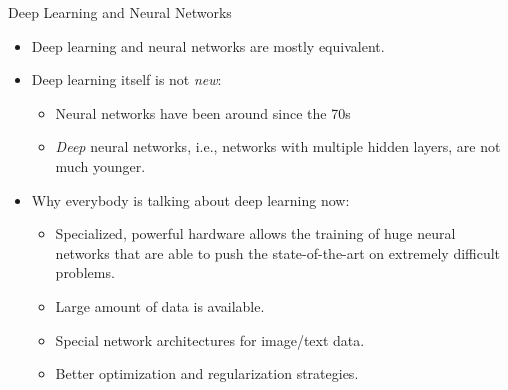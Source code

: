 \begin{frame} {Deep Learning and Neural Networks}
\begin{itemize}
\item Deep learning and neural networks are mostly equivalent.
\vspace{.3cm}
\item Deep learning itself is not \textit{new}:
\begin{itemize}
\item Neural networks have been around since the 70s
\item \textit{Deep} neural networks, i.e., networks with multiple hidden layers, are not much younger.
\end{itemize}
\vspace{.3cm}
\item Why everybody is talking about deep learning now:
\begin{itemize}
\item Specialized, powerful hardware allows the training of huge neural networks that are able to push the state-of-the-art on extremely difficult problems.
\item Large amount of data is available.
\item Special network architectures for image/text data.
\item Better optimization and regularization strategies.
\end{itemize}
\end{itemize}
\end{frame}

